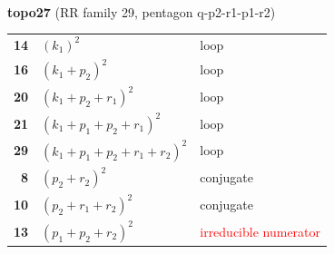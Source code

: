 \documentclass[10pt]{article}
\begin{document}
\begin{minipage}[t]{0.48\textwidth}
{}\\[2mm]\textbf{topo27} (RR family 29, pentagon q-p2-r1-p1-r2)\\[2pt]{\footnotesize\begin{tabular}{@{}r@{\ \ }l@{\ \ }l@{}}\textbf{14} & $(k_1)^2$ & loop\\
\textbf{16} & $(k_1+p_2)^2$ & loop\\
\textbf{20} & $(k_1+p_2+r_1)^2$ & loop\\
\textbf{21} & $(k_1+p_1+p_2+r_1)^2$ & loop\\
\textbf{29} & $(k_1+p_1+p_2+r_1+r_2)^2$ & loop\\
\textbf{8} & $(p_2+r_2)^2$ & conjugate\\
\textbf{10} & $(p_2+r_1+r_2)^2$ & conjugate\\
\textbf{13} & $(p_1+p_2+r_2)^2$ & \textcolor{red}{irreducible numerator}\\\end{tabular}}\end{minipage}\hfill%
\end{document}
